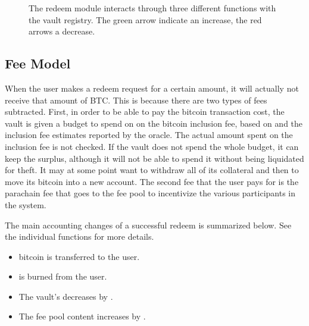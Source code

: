 \documentclass[a4paper,10pt,english]{sphinxmanual}
\begin{document}
\begin{figure}[htbp]
\centering
\capstart

\noindent{}
\caption{The redeem module interacts through three different functions with the vault registry. The green arrow indicate an increase, the red arrows a decrease.}\label{\detokenize{spec/redeem:id19}}\label{\detokenize{spec/redeem:fig-vault-registry-redeem}}\end{figure}


\subsection{Fee Model}
\label{\detokenize{spec/redeem:fee-model}}
When the user makes a redeem request for a certain amount, it will actually not receive that amount of BTC. This is because there are two types of fees subtracted. First, in order to be able to pay the bitcoin transaction cost, the vault is given a budget to spend on on the bitcoin inclusion fee, based on {\hyperref[\detokenize{spec/redeem:redeemtransactionsize}]{}} and the inclusion fee estimates reported by the oracle. The actual amount spent on the inclusion fee is not checked. If the vault does not spend the whole budget, it can keep the surplus, although it will not be able to spend it without being liquidated for theft. It may at some point want to withdraw all of its collateral and then to move its bitcoin into a new account. The second fee that the user pays for is the parachain fee that goes to the fee pool to incentivize the various participants in the system.

The main accounting changes of a successful redeem is summarized below. See the individual functions for more details.
\begin{itemize}
\item {} 
 bitcoin is transferred to the user.

\item {} 
 is burned from the user.

\item {} 
The vault’s  decreases by .

\item {} 
The fee pool content increases by .

\end{itemize}
\end{document}
